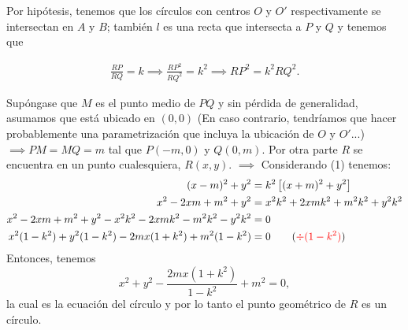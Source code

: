 \begin{dem}
	Por hipótesis, tenemos que los círculos con centros $O$ y $O'$ respectivamente se intersectan en $A$ y $B$; también $l$ es una recta que intersecta a $P$ y $Q$ y tenemos que 
	
	\begin{gather}
		\frac{RP}{RQ}=k\implies \frac{RP^2}{RQ^2}=k^2\implies RP^2 = k^2 RQ^2.
	\end{gather}

	Supóngase que $M$ es el punto medio de $PQ$ y sin pérdida de generalidad, asumamos que está ubicado en $(0,0)$ (En caso contrario, tendríamos que hacer probablemente una parametrización que incluya la ubicación de $O$ y $O'$...) $\implies PM=MQ=m$ tal que $P(-m,0)$ y $Q(0,m)$. Por otra parte $R$ se encuentra en un punto cualesquiera, $R(x,y)$. $\implies$ Considerando (1) tenemos: 
	\begin{align*}
		(x-m)^2+y^2 &= k^2 \left[(x+m)^2+y^2\right]\\
		x^2 -2xm +m^2 +y^2&=x^2k^2+2xmk^2 +m^2k^2  +y^2k^2\\
		x^2 -2xm +m^2 +y^2-x^2k^2-2xmk^2 -m^2k^2  -y^2k^2&= 0\\
		x^2(1-k^2)+y^2(1-k^2)-2mx(1+k^2)+m^2(1-k^2)&= 0 \qquad (\textcolor{red}{\div(1-k^2)})
	\end{align*}	
Entonces, tenemos
$$x^2+y^2 - \frac{2mx(1+k^2)}{1-k^2}+m^2=0,$$
la cual es la ecuación del círculo y por lo tanto el punto geométrico de $R$ es un círculo. 
\end{dem}

